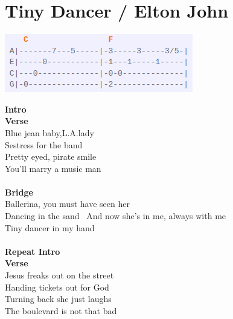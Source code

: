 \section{Tiny Dancer / Elton John}\label{sec:tinydancer}

\includegraphics[scale=.6]{songs/t/TinyDancerRiff.png}


\Cmajor
\Fmajor
\Gmajor
\EminorSeven
\AminorSeven
\Dminor
\Eseven
\Aminor
\Gseven

\textbf{Intro}\\
\textbf{Verse}\\
Blue jean baby,L.A.lady\\
Sestress for the band     \\
Pretty eyed, pirate smile\\
You’ll marry a music man   \\
\\
\textbf{Bridge}\\
Ballerina,  you must have seen her\\
    Dancing in the sand   \
And now she’s in me, always with me\\
\upchord{C}Tiny \upchord{C}dancer in my \upchord{G}hand   \upchord{F}          \\
\\
\textbf{Repeat Intro}\\
\textbf{Verse}\\
Jesus freaks out on the street\\
Handing tickets out for God    \\
Turning \upchord{F}back she just laughs\\
\upchord{C}The boule\upchord{C}vard is not that bad   \upchord{F}     \\
